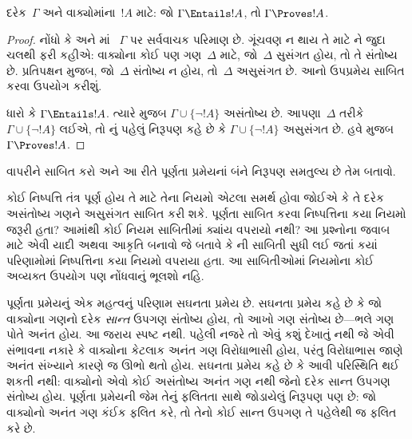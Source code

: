 \begin{cor}[પૂર્ણતા પ્રમેય, બીજું નિરૂપણ]
દરેક~$\Gamma$ અને વાક્યોમાંના~$!A$ માટે: જો $\Gamma\Entails !A$, તો
$\Gamma\Proves !A$.
\end{cor}

\begin{proof}
નોંધો કે  અને માં
~$\Gamma$ પર સર્વવાચક પરિમાણ છે. ગૂંચવણ ન થાય તે માટે
ને જુદા ચલથી ફરી કહીએ: વાક્યોના કોઈ પણ
ગણ~$\Delta$ માટે, જો~$\Delta$ સુસંગત હોય, તો તે સંતોષ્ય છે.
પ્રતિપક્ષન મુજબ, જો~$\Delta$ સંતોષ્ય ન હોય, તો~$\Delta$ અસુસંગત છે. આનો
ઉપપ્રમેય સાબિત કરવા ઉપયોગ કરીશું.

ધારો કે $\Gamma\Entails !A$. ત્યારે 
મુજબ $\Gamma\cup\{\lnot !A\}$ અસંતોષ્ય છે. આપણા~$\Delta$ તરીકે
$\Gamma\cup\{\lnot !A\}$ લઈએ, તો નું પહેલું
નિરૂપણ કહે છે કે $\Gamma\cup\{\lnot !A\}$ અસુસંગત છે. હવે
%
મુજબ $\Gamma\Proves !A$.
\end{proof}

\begin{prob}
 વાપરીને
 સાબિત કરો અને આ રીતે પૂર્ણતા
પ્રમેયનાં બંને નિરૂપણ સમતુલ્ય છે તેમ બતાવો.
\end{prob}



\begin{prob}
કોઈ નિષ્પત્તિ તંત્ર પૂર્ણ હોય તે માટે તેના નિયમો એટલા સમર્થ હોવા
જોઈએ કે તે દરેક અસંતોષ્ય ગણને અસુસંગત સાબિત કરી શકે. પૂર્ણતા સાબિત કરવા
નિષ્પત્તિના કયા નિયમો જરૂરી હતા? આમાંથી કોઈ નિયમ સાબિતીમાં ક્યાંય
વપરાયો નથી? આ પ્રશ્નોના જવાબ માટે એવી યાદી અથવા આકૃતિ બનાવો જે બતાવે
કે ની સાબિતી સુધી લઈ જતાં કયાં
પરિણામોમાં નિષ્પત્તિના કયા નિયમો વપરાયા હતા. આ સાબિતીઓમાં નિયમોના
કોઈ અવ્યક્ત ઉપયોગ પણ નોંધવાનું ભૂલશો નહિ.
\end{prob}


\endgroup


\begingroup
\makeatletter{}\makeatother


\label{guunit:OLP-0135}


પૂર્ણતા પ્રમેયનું એક મહત્વનું પરિણામ સઘનતા પ્રમેય છે. સઘનતા પ્રમેય
કહે છે કે જો વાક્યોના ગણનો દરેક \emph{સાન્ત} ઉપગણ સંતોષ્ય હોય,
તો આખો ગણ સંતોષ્ય છે—ભલે ગણ પોતે અનંત હોય. આ જરાય સ્પષ્ટ નથી. પહેલી
નજરે તો એવું કશું દેખાતું નથી જે એવી સંભાવના નકારે કે વાક્યોના
કેટલાક અનંત ગણ વિરોધાભાસી હોય, પરંતુ વિરોધાભાસ જાણે અનંત સંખ્યાને
કારણે જ ઊભો થતો હોય. સઘનતા પ્રમેય કહે છે કે આવી પરિસ્થિતિ થઈ શકતી
નથી: વાક્યોનો એવો કોઈ અસંતોષ્ય અનંત ગણ નથી જેનો દરેક સાન્ત ઉપગણ સંતોષ્ય
હોય. પૂર્ણતા પ્રમેયની જેમ તેનું ફલિતતા સાથે જોડાયેલું નિરૂપણ પણ છે:
જો વાક્યોનો અનંત ગણ કંઈક ફલિત કરે, તો તેનો કોઈ સાન્ત ઉપગણ તે
પહેલેથી જ ફલિત કરે છે.

